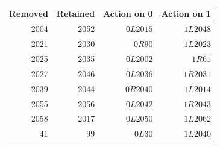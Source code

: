 \begin{center}\small
\begin{tabular}{@{}rrrr@{}}
\toprule Removed & Retained & Action on 0 & Action on 1\\\midrule
2004 & 2052 & \(0L2015\) & \(1L2048\)\\
2021 & 2030 & \(0R90\) & \(1L2023\)\\
2025 & 2035 & \(0L2002\) & \(1R61\)\\
2027 & 2046 & \(0L2036\) & \(1R2031\)\\
2039 & 2044 & \(0R2040\) & \(1L2014\)\\
2055 & 2056 & \(0L2042\) & \(1R2043\)\\
2058 & 2017 & \(0L2050\) & \(1L2062\)\\
41 & 99 & \(0L30\) & \(1L2040\)\\
\bottomrule\end{tabular}
\end{center}
